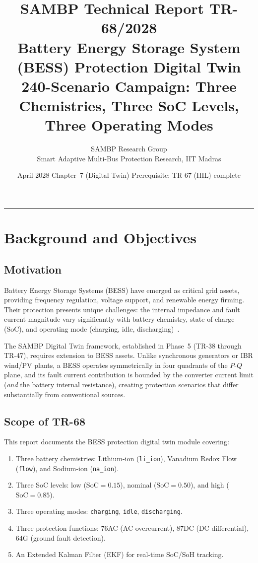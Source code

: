 \documentclass[11pt, a4paper]{article}
\title{\textbf{\textsf{\color{sambpblue}SAMBP Technical Report TR-68/2028}}\\[6pt]
  \Large Battery Energy Storage System (BESS) Protection Digital Twin\\[4pt]
  \normalsize 240-Scenario Campaign: Three Chemistries, Three SoC Levels,
  Three Operating Modes}
\author{SAMBP Research Group\\[2pt]
  \small Smart Adaptive Multi-Bus Protection Research, IIT Madras}
\date{April 2028\quad\textbar\quad
  Chapter~7 (Digital Twin)\quad\textbar\quad
  Prerequisite: TR-67 (HIL) complete}
\begin{document}
\maketitle
\tableofcontents
\vspace{6pt}\hrule\vspace{10pt}

\section{Background and Objectives}
\label{sec:background}

\subsection{Motivation}

Battery Energy Storage Systems (BESS) have emerged as critical grid assets,
providing frequency regulation, voltage support, and renewable energy firming.
Their protection presents unique challenges: the internal impedance and
fault current magnitude vary significantly with battery chemistry, state of
charge (SoC), and operating mode (charging, idle, discharging)~\cite{Oudalov2009}.

The SAMBP Digital Twin framework, established in Phase~5 (TR-38 through TR-47),
requires extension to BESS assets. Unlike synchronous generators or
IBR wind/PV plants, a BESS operates symmetrically in four quadrants of the
$P$-$Q$ plane, and its fault current contribution is bounded by the converter
current limit (\emph{and} the battery internal resistance), creating
protection scenarios that differ substantially from conventional sources.

\subsection{Scope of TR-68}

This report documents the BESS protection digital twin module covering:
\begin{enumerate}
  \item Three battery chemistries: Lithium-ion (\texttt{li\_ion}),
    Vanadium Redox Flow (\texttt{flow}), and Sodium-ion (\texttt{na\_ion}).
  \item Three SoC levels: low ($\mathrm{SoC} = 0.15$),
    nominal ($\mathrm{SoC} = 0.50$), and high ($\mathrm{SoC} = 0.85$).
  \item Three operating modes: \texttt{charging}, \texttt{idle},
    \texttt{discharging}.
  \item Three protection functions: 76AC (AC overcurrent),
    87DC (DC differential), 64G (ground fault detection).
  \item An Extended Kalman Filter (EKF) for real-time SoC/SoH tracking.
\end{enumerate}
\end{document}
